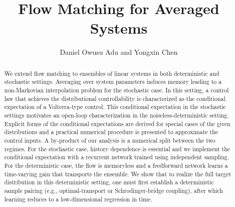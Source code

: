 \documentclass[12pt]{amsart}
\title{
Flow Matching for Averaged Systems
}
\author{Daniel Owusu Adu and Yongxin Chen%
}
\renewcommand{\(}{\left (}
\renewcommand{\)}{\right )}
\numberwithin{equation}{section}
\begin{document}
\maketitle
\thispagestyle{empty}
\pagestyle{empty}


\begin{abstract}
We extend flow matching to ensembles of linear systems in both deterministic and stochastic settings. Averaging over system parameters induces memory leading to a non-Markovian interpolation problem for the stochastic case. In this setting, a control law that achieves the distributional controllability is characterized as the conditional expectation of a Volterra-type control. This conditional expectation in the stochastic settings motivates an open-loop characterization in the noiseless-deterministic setting. Explicit forms of the conditional expectations are derived for special cases of the given distributions and a practical numerical procedure is presented to approximate the control inputs. A by-product of our analysis is a numerical split between the two regimes. For the stochastic case, history dependence is essential and we implement the conditional expectation with a recurrent network trained using independent sampling. For the deterministic case, the flow is memoryless and a feedforward network learns a time-varying gain that transports the ensemble. We show that to realize the full target distribution in this deterministic setting, one must first establish a deterministic sample pairing (e.g., optimal-transport or Schrodinger-bridge coupling), after which learning reduces to a low-dimensional regression in time.
\end{abstract}

\end{document}
